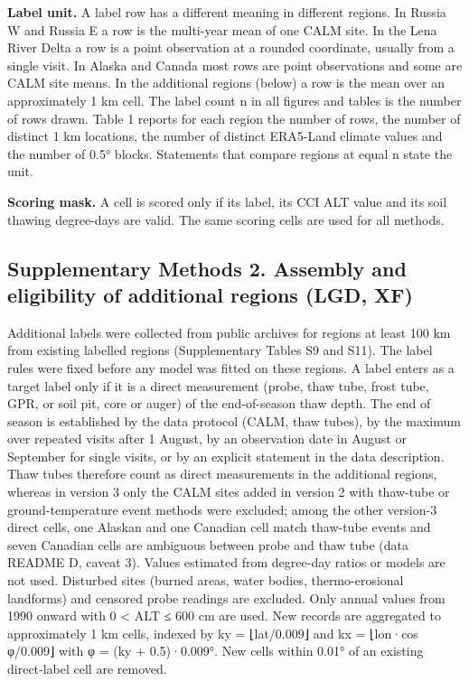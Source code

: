 \textbf{Label unit.} A label row has a different meaning in different regions. In Russia W and Russia E a row is the multi-year mean of one CALM site. In the Lena River Delta a row is a point observation at a rounded coordinate, usually from a single visit. In Alaska and Canada most rows are point observations and some are CALM site means. In the additional regions (below) a row is the mean over an approximately 1 km cell. The label count n in all figures and tables is the number of rows drawn. Table 1 reports for each region the number of rows, the number of distinct 1 km locations, the number of distinct ERA5-Land climate values and the number of 0.5° blocks. Statements that compare regions at equal n state the unit.

\textbf{Scoring mask.} A cell is scored only if its label, its CCI ALT value and its soil thawing degree-days are valid. The same scoring cells are used for all methods.

\subsection*{Supplementary Methods 2. Assembly and eligibility of additional regions (LGD, XF)}

Additional labels were collected from public archives for regions at least 100 km from existing labelled regions (Supplementary Tables S9 and S11). The label rules were fixed before any model was fitted on these regions. A label enters as a target label only if it is a direct measurement (probe, thaw tube, frost tube, GPR, or soil pit, core or auger) of the end-of-season thaw depth. The end of season is established by the data protocol (CALM, thaw tubes), by the maximum over repeated visits after 1 August, by an observation date in August or September for single visits, or by an explicit statement in the data description. Thaw tubes therefore count as direct measurements in the additional regions, whereas in version 3 only the CALM sites added in version 2 with thaw-tube or ground-temperature event methods were excluded; among the other version-3 direct cells, one Alaskan and one Canadian cell match thaw-tube events and seven Canadian cells are ambiguous between probe and thaw tube (data README D, caveat 3). Values estimated from degree-day ratios or models are not used. Disturbed sites (burned areas, water bodies, thermo-erosional landforms) and censored probe readings are excluded. Only annual values from 1990 onward with 0 < ALT ≤ 600 cm are used. New records are aggregated to approximately 1 km cells, indexed by ky = ⌊lat/0.009⌋ and kx = ⌊lon·cos φ/0.009⌋ with φ = (ky + 0.5)·0.009°. New cells within 0.01° of an existing direct-label cell are removed.

